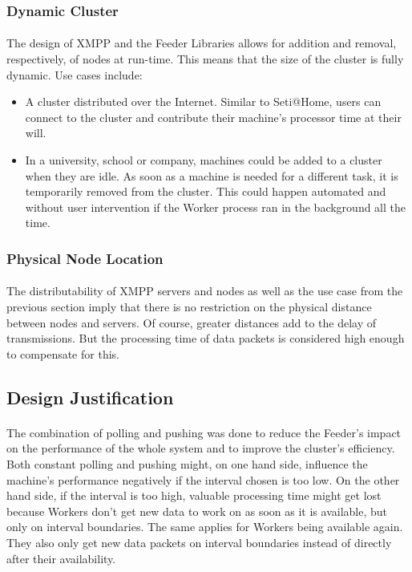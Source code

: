 \subsubsection{Dynamic Cluster}
\paragraph{}
The design of XMPP and the Feeder Libraries allows for addition and removal, respectively, of nodes at run-time. This means that the size of the cluster is fully dynamic. Use cases include:
\begin{itemize}
\item A cluster distributed over the Internet. Similar to Seti@Home, users can connect to the cluster and contribute their machine's processor time at their will.
\item In a university, school or company, machines could be added to a cluster when they are idle. As soon as a machine is needed for a different task, it is temporarily removed from the cluster. This could happen automated and without user intervention if the Worker process ran in the background all the time.
\end{itemize}

\subsubsection{Physical Node Location}
\paragraph{}
The distributability of XMPP servers and nodes as well as the use case from the previous section imply that there is no restriction on the physical distance between nodes and servers. Of course, greater distances add to the delay of transmissions. But the processing time of data packets is considered high enough to compensate for this.

\subsection{Design Justification}
\paragraph{}
The combination of polling and pushing was done to reduce the Feeder's impact on the performance of the whole system and to improve the cluster's efficiency. Both constant polling and pushing might, on one hand side, influence the machine's performance negatively if the interval chosen is too low. On the other hand side, if the interval is too high, valuable processing time might get lost because Workers don't get new data to work on as soon as it is available, but only on interval boundaries. The same applies for Workers being available again. They also only get new data packets on interval boundaries instead of directly after their availability.

